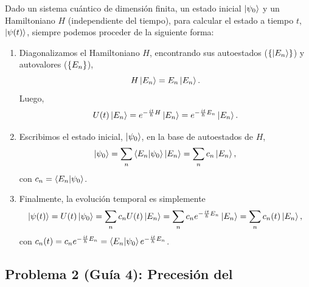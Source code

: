 \documentclass[10pt, a4paper]{article}
\numberwithin{equation}{subsection}
\begin{document}
\begin{mdframed}[style=mainframe,
  frametitle={Evolución temporal de estados [dim. finita, $H$ indep. tiempo]}]
  Dado un sistema cuántico de dimensión finita, un estado inicial
  $\ket{\psi_0}$ y un Hamiltoniano $H$ (independiente del tiempo), para
  calcular el estado a tiempo $t$, $\ket{\psi(t)}$, siempre podemos proceder de
  la siguiente forma:
  \begin{enumerate}
    \item Diagonalizamos el Hamiltoniano $H$, encontrando sus autoestados
      ($\set{\ket{E_n}}$) y autovalores ($\set{E_n}$),
      \begin{equation}
        H\ket{E_n} = E_n\ket{E_n}.
      \end{equation}
      Luego,
      \begin{equation}
        U(t)\ket{E_n} = e^{-\frac{it}{\hbar}H}\ket{E_n} =
        e^{-\frac{it}{\hbar}E_n}\ket{E_n}.
      \end{equation}
    \item Escribimos el estado inicial, $\ket{\psi_0}$, en la base de
      autoestados de $H$,
      \begin{equation}
        \ket{\psi_0} = \sum_{n}\braket{E_n}{\psi_0}\ket{E_n} =
        \sum_{n}c_n\ket{E_n},
      \end{equation}
      con $c_n = \braket{E_n}{\psi_0}$.
    \item Finalmente, la evolución temporal es simplemente
      \begin{equation}
        \ket{\psi(t)} = U(t)\ket{\psi_0} = \sum_{n}c_nU(t)\ket{E_n} =
        \sum_{n}c_ne^{-\frac{it}{\hbar}E_n}\ket{E_n} =
        \sum_{n}c_n(t)\ket{E_n},
      \end{equation}
      con $c_n(t) = c_ne^{-\frac{it}{\hbar}E_n} =
      \braket{E_n}{\psi_0}e^{-\frac{it}{\hbar}E_n}$.
  \end{enumerate}
\end{mdframed}

\subsection{Problema 2 (Guía 4): Precesión del \spin}
\end{document}
